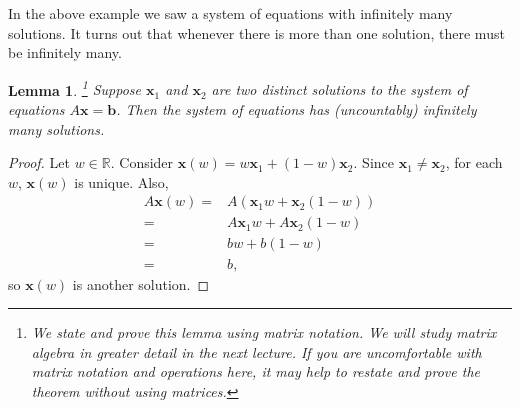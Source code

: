 \documentclass[12pt,reqno]{amsart}
\newtheorem{lemma}{Lemma}[section]
\theoremstyle{definition}
\begin{document}
In the above example we saw a system of equations with infinitely many
solutions. It turns out that whenever there is more than one solution,
there must be infinitely many.
\begin{lemma}\label{lem:sinf}
  \footnote{We state and prove this lemma using matrix notation. We
    will study matrix algebra in greater detail in the next
    lecture. If you are uncomfortable with matrix notation and
    operations here, it may help to restate and prove the theorem
    without using matrices.}  
  Suppose $\mathbf{x}_1$ and $\mathbf{x}_2$ are two distinct solutions
  to the system of equations $A \mathbf{x} = \mathbf{b}$. Then the
  system of equations has (uncountably) infinitely many solutions.
\end{lemma}
\begin{proof}
  Let $w \in \mathbb{R}$. Consider $\mathbf{x}(w) = w
  \mathbf{x}_1 + (1 - w)\mathbf{x}_2$. Since $\mathbf{x}_1 \neq
  \mathbf{x}_2$, for each $w$, $\mathbf{x}(w)$ is unique. Also,
  \begin{align*}
    A \mathbf{x}(w) = & A \left( \mathbf{x}_1 w + \mathbf{x}_2 (1-w)
    \right) \\
    = & A \mathbf{x}_1 w + A \mathbf{x}_2 (1-w) \\
    = & b w + b (1- w) \\
    = & b,
  \end{align*}
  so $\mathbf{x}(w)$ is another solution. 
\end{proof}
\end{document}
